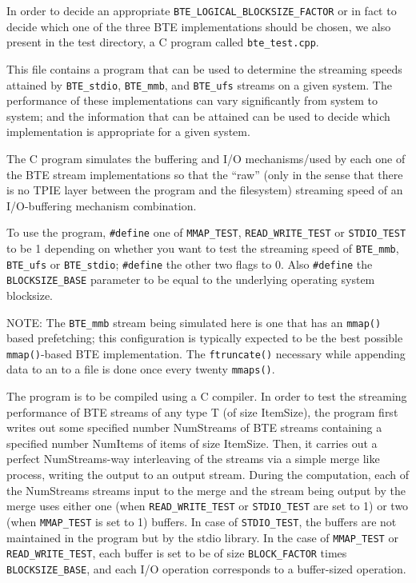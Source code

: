 In order to decide an appropriate \verb|BTE_LOGICAL_BLOCKSIZE_FACTOR|
or in fact to decide which one of the three BTE implementations 
should be chosen, we also present in the test directory, a C program
called \verb|bte_test.cpp|.
  

This file contains a program that can be used to determine the 
streaming speeds attained by \verb|BTE_stdio|, \verb|BTE_mmb|, and
\verb|BTE_ufs| 
streams on a given system. The performance of these implementations
can vary significantly from system to system; and the information 
that can be attained  can be used to decide which implementation
is appropriate for a given system. 

The C program simulates the buffering and I/O mechanisms/used by each 
one of the BTE stream implementations so that the ``raw'' (only in the 
sense that there is no TPIE layer between
the program and the filesystem) streaming speed of an 
I/O-buffering mechanism combination.

To use the program,  \verb|#define| one of  \verb|MMAP_TEST|,
\verb|READ_WRITE_TEST| or  \verb|STDIO_TEST|
 to be 1 depending on whether you want to test the streaming
speed of  \verb|BTE_mmb|, \verb|BTE_ufs| or  \verb|BTE_stdio|;
\verb|#define|  the other two 
flags to 0. Also \verb|#define| the \verb|BLOCKSIZE_BASE|
 parameter to be equal to the underlying operating system blocksize. 

NOTE: The \verb|BTE_mmb| stream being simulated here is one that has 
an \verb|mmap()| based prefetching; this configuration is typically expected
to be the best possible \verb|mmap()|-based BTE implementation. The \verb|ftruncate()|
necessary while appending data to an to a file is done once every
twenty \verb|mmaps()|.  

The program is to be compiled using a C compiler. In order to test the streaming 
performance of  BTE streams of any type T (of size ItemSize), the program 
first writes out some specified number NumStreams of BTE streams containing 
a specified number NumItems of items of size ItemSize. Then, it carries
out a perfect NumStreams-way interleaving of the streams via a simple
merge like process, writing the output to an output stream. During the 
computation, each of the NumStreams streams input to the merge and 
the stream being output by the merge uses either one (when \verb|READ_WRITE_TEST|
or \verb|STDIO_TEST| are set to 1)  or two (when \verb|MMAP_TEST| 
is set to 1) buffers.
In case of \verb|STDIO_TEST|, the buffers are not maintained in the program
but by the stdio library. In the case of \verb|MMAP_TEST| or \verb|READ_WRITE_TEST|,
each buffer is set to be of size \verb|BLOCK_FACTOR| times \verb|BLOCKSIZE_BASE|, and
each I/O operation corresponds to a buffer-sized operation. 

